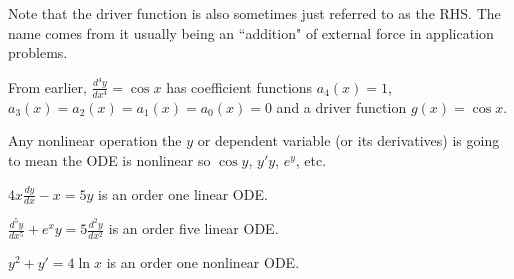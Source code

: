 \documentclass[notes]{subfiles}
\begin{document}
Note that the driver function is also sometimes just referred to as the RHS. The name comes from it usually being an ``addition" of external force in application problems.

\begin{example}
    From earlier, $\frac{d^4 y}{dx^4} = \cos x$ has coefficient functions $a_4(x) = 1$, $a_3(x) = a_2(x) = a_1(x) = a_0(x) = 0$ and a driver function $g(x) = \cos x$.
\end{example}

Any nonlinear operation the $y$ or dependent variable (or its derivatives) is going to mean the ODE is nonlinear so $\cos y$, $y' y$, $e^y$, etc.

\begin{example}
    $4x \frac{dy}{dx} - x = 5y$ is an order one linear ODE.
\end{example}
\begin{example}
    $\frac{d^5y}{dx^5} + e^x y = 5\frac{d^2 y}{dx^2}$ is an order five linear ODE.
\end{example}
\begin{example}
    $y^2 + y' = 4\ln x$ is an order one nonlinear ODE.
\end{example}
\end{document}
